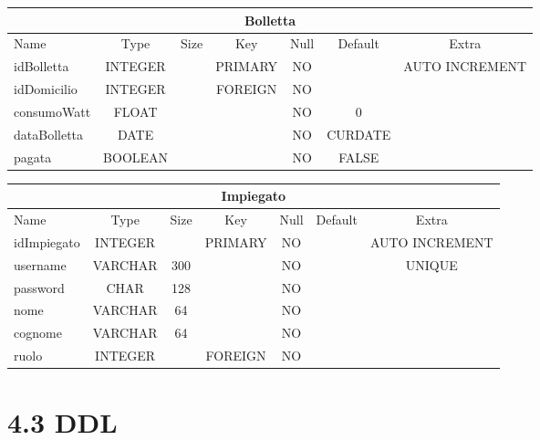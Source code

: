 \begin{center}
    \begin{tabular}{ |l|c|c|c|c|c|c| } 
        \hline
        \multicolumn{7}{|c|}{Bolletta} \\
        \hline
            Name             & Type     & Size  & Key       & Null  & Default   & Extra \\
        \hline
            idBolletta       & INTEGER  &       & PRIMARY   & NO    &           & AUTO INCREMENT \\
            idDomicilio      & INTEGER  &       & FOREIGN   & NO    &           & \\
            consumoWatt      & FLOAT    &       &           & NO    & 0         & \\
            dataBolletta     & DATE     &       &           & NO    & CURDATE   & \\
            pagata           & BOOLEAN  &       &           & NO    & FALSE     & \\
        \hline
    \end{tabular}
\end{center}
\begin{center}
    \begin{tabular}{ |l|c|c|c|c|c|c| } 
        \hline
        \multicolumn{7}{|c|}{Impiegato} \\
        \hline
            Name             & Type     & Size  & Key       & Null  & Default   & Extra \\
        \hline
            idImpiegato      & INTEGER  &       & PRIMARY   & NO    &           & AUTO INCREMENT \\
            username         & VARCHAR  & 300   &           & NO    &           & UNIQUE \\
            password         & CHAR     & 128   &           & NO    &           & \\
            nome             & VARCHAR  & 64    &           & NO    &           & \\
            cognome          & VARCHAR  & 64    &           & NO    &           & \\
            ruolo            & INTEGER  &       & FOREIGN   & NO    &           & \\
        \hline
    \end{tabular}
\end{center}

\section*{4.3 \hspace{1cm} DDL}
